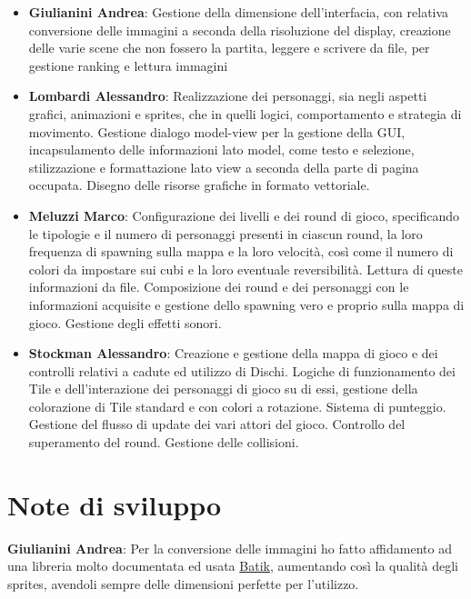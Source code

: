 \documentclass[a4paper,12pt, hidelinks]{report}
\begin{document}
\begin{itemize}
	\item \textbf{Giulianini Andrea}: Gestione della dimensione dell'interfacia, con relativa conversione delle immagini a seconda della risoluzione del display, creazione delle varie scene che non fossero la partita, leggere e scrivere da file, per gestione ranking e lettura immagini

	\item \textbf{Lombardi Alessandro}: Realizzazione dei personaggi, sia negli aspetti grafici, animazioni e sprites, che in quelli logici, comportamento e strategia di movimento. Gestione dialogo model-view per la gestione della GUI, incapsulamento delle informazioni lato model, come testo e selezione, stilizzazione e formattazione lato view a seconda della parte di pagina occupata. Disegno delle risorse grafiche in formato vettoriale.

	\item \textbf{Meluzzi Marco}: Configurazione dei livelli e dei round di gioco, specificando le tipologie e il numero di personaggi presenti in ciascun round, la loro frequenza di spawning sulla mappa e la loro velocità, così come il numero di colori da impostare sui cubi e la loro eventuale reversibilità. Lettura di queste informazioni da file. Composizione dei round e dei personaggi con le informazioni acquisite e gestione dello spawning vero e proprio sulla mappa di gioco. Gestione degli effetti sonori.

	\item \textbf{Stockman Alessandro}: Creazione e gestione della mappa di gioco e dei controlli relativi a cadute ed utilizzo di Dischi. Logiche di funzionamento dei Tile e dell'interazione dei personaggi di gioco su di essi, gestione della colorazione di Tile standard e con colori a rotazione. Sistema di punteggio. Gestione del flusso di update dei vari attori del gioco. Controllo del superamento del round. Gestione delle collisioni.

\end{itemize}

\section{Note di sviluppo}

	\item \textbf{Giulianini Andrea}: Per la conversione delle immagini ho fatto affidamento ad una libreria molto documentata ed usata \href{https://xmlgraphics.apache.org/batik/using/swing.html}{Batik}, aumentando così la qualità degli sprites, avendoli sempre delle dimensioni perfette per l'utilizzo.
\end{document}
